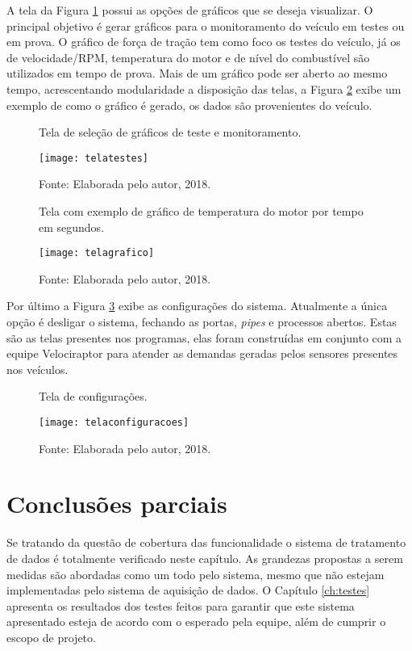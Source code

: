 A tela da Figura \ref{fig:telatestes} possui as opções de gráficos que se deseja visualizar. O principal objetivo é gerar gráficos para o monitoramento do veículo em testes ou em prova. O gráfico de força de tração tem como foco os testes do veículo, já os de velocidade/RPM, temperatura do motor e de nível do combustível são utilizados em tempo de prova. Mais de um gráfico pode ser aberto ao mesmo tempo, acrescentando modularidade a disposição das telas, a Figura \ref{fig:telagrafico} exibe um exemplo de como o gráfico é gerado, os dados são provenientes do veículo.

\begin{figure}[!htb]
	\centering
		\caption{Tela de seleção de gráficos de teste e monitoramento.}
		\texttt{[image: telatestes]} 
		\caption*{Fonte: Elaborada pelo autor, 2018.}
		\label{fig:telatestes}
\end{figure}    

\begin{figure}[!htb]
	\centering
		\caption{Tela com exemplo de gráfico de temperatura do motor por tempo em segundos.}
		\texttt{[image: telagrafico]} 
		\caption*{Fonte: Elaborada pelo autor, 2018.}
		\label{fig:telagrafico}
\end{figure}    

Por último a Figura \ref{fig:telaconfiguracao} exibe as configurações do sistema. Atualmente a única opção é desligar o sistema, fechando as portas, \textit{pipes} e processos abertos. Estas são as telas presentes nos programas, elas foram construídas em conjunto com a equipe Velociraptor para atender as demandas geradas pelos sensores presentes nos veículos.


\begin{figure}[!htb]
	\centering
		\caption{Tela de configurações.}
		\texttt{[image: telaconfiguracoes]} 
		\caption*{Fonte: Elaborada pelo autor, 2018.}
		\label{fig:telaconfiguracao}
\end{figure}    

\section{Conclusões parciais}

Se tratando da questão de cobertura das funcionalidade o sistema de tratamento de dados é totalmente verificado neste capítulo. As grandezas propostas a serem medidas são abordadas como um todo pelo sistema, mesmo que não estejam implementadas pelo sistema de aquisição de dados. O Capítulo \ref{ch:testes} apresenta os resultados dos testes feitos para garantir que este sistema apresentado esteja de acordo com o esperado pela equipe, além de cumprir o escopo de projeto.